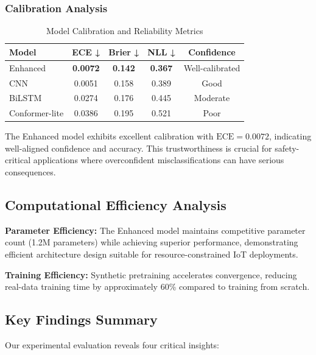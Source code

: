 \documentclass[journal]{IEEEtran}
\begin{document}
\subsubsection{Calibration Analysis}

\begin{table}[ht]
\centering
\caption{Model Calibration and Reliability Metrics}
\begin{tabular}{@{}lcccc@{}}
\toprule
Model & ECE ↓ & Brier ↓ & NLL ↓ & Confidence \\
\midrule
Enhanced & \textbf{0.0072} & \textbf{0.142} & \textbf{0.367} & Well-calibrated \\
CNN & 0.0051 & 0.158 & 0.389 & Good \\
BiLSTM & 0.0274 & 0.176 & 0.445 & Moderate \\
Conformer-lite & 0.0386 & 0.195 & 0.521 & Poor \\
\bottomrule
\end{tabular}
\label{tab:calibration}
\end{table}

The Enhanced model exhibits excellent calibration with $\text{ECE}=0.0072$, indicating well-aligned confidence and accuracy. This trustworthiness is crucial for safety-critical applications where overconfident misclassifications can have serious consequences.

\subsection{Computational Efficiency Analysis}

\textbf{Parameter Efficiency:} The Enhanced model maintains competitive parameter count (1.2M parameters) while achieving superior performance, demonstrating efficient architecture design suitable for resource-constrained IoT deployments.

\textbf{Training Efficiency:} Synthetic pretraining accelerates convergence, reducing real-data training time by approximately 60\% compared to training from scratch.

\subsection{Key Findings Summary}

Our experimental evaluation reveals four critical insights:
\end{document}
